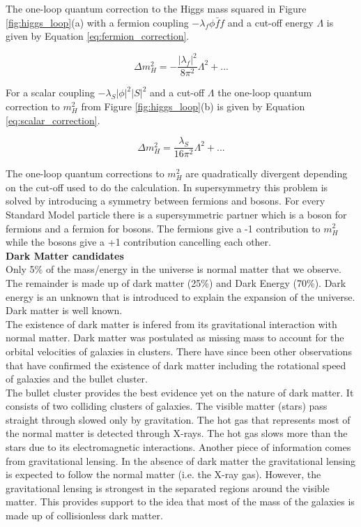 The one-loop quantum correction to the Higgs mass squared in Figure 
\ref{fig:higgs_loop}(a) with a fermion coupling $-\lambda_{f}\phi\bar{f}f$ and 
a cut-off energy $\Lambda$ is given by Equation \ref{eq:fermion_correction}.

\begin{equation}
\Delta m_{H}^{2} = -\frac{|\lambda_{f}|^{2}}{8\pi^{2}}\Lambda^{2} + ...
\label{eq:fermion_correction}
\end{equation}

For a scalar coupling $-\lambda_{S}|\phi|^{2}|S|^{2}$ and a cut-off $\Lambda$ 
the one-loop quantum correction to $m_{H}^{2}$ from Figure 
\ref{fig:higgs_loop}(b) is given by Equation \ref{eq:scalar_correction}.

\begin{equation}
\Delta m_{H}^{2} = \frac{\lambda_{S}}{16\pi^{2}}\Lambda^{2} + ...
\label{eq:scalar_correction}
\end{equation}

The one-loop quantum corrections to $m_{H}^{2}$ are quadratically divergent
depending on the cut-off used to do the calculation. In supersymmetry this
problem is solved by introducing a symmetry between fermions and bosons. For 
every Standard Model particle there is a supersymmetric partner which is a boson 
for fermions and a fermion for bosons. The fermions give a -1 contribution to 
$m_{H}^{2}$ while the bosons give a +1 contribution cancelling each other. \\

{\bf Dark Matter candidates} \\

Only 5\% of the mass/energy in the universe is normal matter that we observe. 
The remainder is made up of dark matter (25\%) and Dark Energy (70\%). Dark
energy is an unknown that is introduced to explain the expansion of the
universe. Dark matter is well known. \\

The existence of dark matter is infered from its gravitational interaction with
normal matter. Dark matter was postulated as missing mass to account for the 
orbital velocities of galaxies in clusters. There have since been other 
observations that have confirmed the existence of dark matter including the 
rotational speed of galaxies and the bullet cluster. \\

The bullet cluster provides the best evidence yet on the nature of dark matter. 
It consists of two colliding clusters of galaxies. The visible matter (stars) 
pass straight through slowed only by gravitation. The hot gas that represents 
most of the normal matter is detected through X-rays. The hot gas slows more 
than the stars due to its electromagnetic interactions. Another piece of
information comes from gravitational lensing. In the absence of dark matter the
gravitational lensing is expected to follow the normal matter (i.e. the X-ray 
gas). However, the gravitational lensing is strongest in the separated regions
around the visible matter. This provides support to the idea that most of the 
mass of the galaxies is made up of collisionless dark matter. \\

